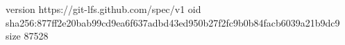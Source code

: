 version https://git-lfs.github.com/spec/v1
oid sha256:877ff2e20bab99cd9ea6f637adbd43ed950b27f2fc9b0b84facb6039a21b9dc9
size 87528
